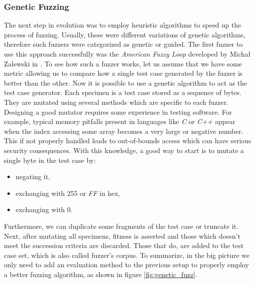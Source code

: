 \subsubsection{Genetic Fuzzing}

The next step in evolution was to employ heuristic algorithms to speed up the process of fuzzing. Usually, these were different variations of genetic algorithms, therefore such fuzzers were categorized as genetic or guided. The first fuzzer to use this approach successfully was the \textit{American Fuzzy Loop} developed by Michał Zalewski in \cite{afl}. To see how such a fuzzer works, let us assume that we have some metric allowing us to compare how a single test case generated by the fuzzer is better than the other. Now it is possible to use a genetic algorithm to act as the test case generator. Each specimen is a test case stored as a sequence of bytes. They are mutated using several methods which are specific to each fuzzer. Designing a good mutator requires some experience in testing software. For example, typical memory pitfalls present in languages like \textit{C} or \textit{C++} appear when the index accessing some array becomes a very large or negative number. This if not properly handled leads to out-of-bounds access which can have serious security consequences. With this knowledge, a good way to start is to mutate a single byte in the test case by:
\begin{itemize}
    \item negating it,
    \item exchanging with 255 or \textit{FF} in hex,
    \item exchanging with 0.
\end{itemize}
Furthermore, we can duplicate some fragments of the test case or truncate it. Next, after mutating all specimens, fitness is asserted and those which doesn't meet the succession criteria are discarded. Those that do, are added to the test case set, which is also called fuzzer's corpus. To summarize, in the big picture we only need to add an evaluation method to the previous setup to properly employ a better fuzzing algorithm, as shown in figure \ref{fig:genetic_fuzz}.  

